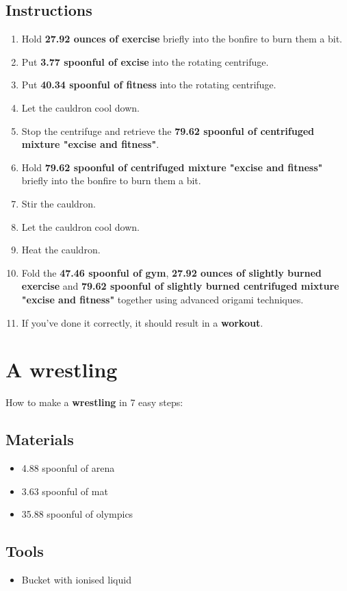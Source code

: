 \documentclass{article}
\begin{document}
\subsection{Instructions}\begin{enumerate}
\item 
Hold \textbf{27.92 ounces of exercise} briefly into the bonfire to burn them a bit.
\item 
Put \textbf{3.77 spoonful of excise} into the rotating centrifuge.
\item 
Put \textbf{40.34 spoonful of fitness} into the rotating centrifuge.
\item 
Let the cauldron cool down.
\item 
Stop the centrifuge and retrieve the \textbf{79.62 spoonful of centrifuged mixture "excise and fitness"}.
\item 
Hold \textbf{79.62 spoonful of centrifuged mixture "excise and fitness"} briefly into the bonfire to burn them a bit.
\item 
Stir the cauldron.
\item 
Let the cauldron cool down.
\item 
Heat the cauldron.
\item 
Fold the \textbf{47.46 spoonful of gym}, \textbf{27.92 ounces of slightly burned exercise} and \textbf{79.62 spoonful of slightly burned centrifuged mixture "excise and fitness"} together using advanced origami techniques.
\item 
If you've done it correctly, it should result in a \textbf{workout}.
\end{enumerate}
\newpage
\section{A wrestling}How to make a \textbf{wrestling} in 7 easy steps:

\subsection{Materials}\begin{itemize}
\item 
4.88 spoonful of arena
\item 
3.63 spoonful of mat
\item 
35.88 spoonful of olympics
\end{itemize}
\subsection{Tools}\begin{itemize}
\item 
Bucket with ionised liquid
\end{itemize}
\end{document}
